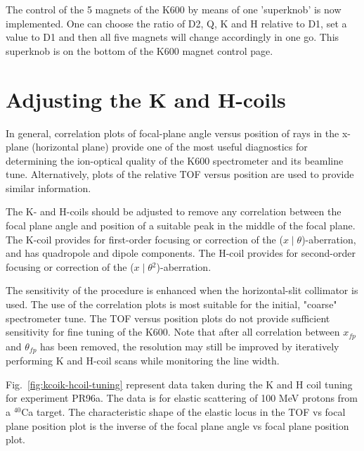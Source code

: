 \documentclass[11pt]{report}
\begin{document}
The control of the 5 magnets of the K600 by means of one 'superknob' is now
implemented. One can choose the ratio of D2, Q, K and H  relative to D1,
set a value to D1 and then all five magnets will change accordingly in
one go.
This superknob is on the bottom of the K600 magnet control page.



\section{Adjusting the K and H-coils}\label{sec:Adjusting-the-K-and-H-coils}

In general, correlation plots of focal-plane angle versus position of rays in
the x-plane (horizontal plane) provide one of the most useful diagnostics for
determining the ion-optical quality of the K600 spectrometer and its beamline
tune.  
Alternatively, plots of the relative TOF versus position are used to provide 
similar information.  

The K- and H-coils should be adjusted to 
remove any correlation between the focal plane angle and position of a
suitable peak in the middle of the focal plane.  The 
K-coil provides for first-order focusing or correction of the 
($x\mid\theta$)-aberration, and has quadropole and dipole components.
The H-coil provides for second-order focusing or correction of the 
($x\mid\theta$$^2$)-aberration.


The sensitivity of the procedure is enhanced when the horizontal-slit 
collimator is used.  The use of the correlation plots is most suitable for 
the initial, "coarse" spectrometer tune. The TOF versus 
position plots do not provide sufficient sensitivity for fine tuning of the 
K600.  
Note that after all correlation between $x_{fp}$ and $\theta_{fp}$ has been removed, 
the resolution may still be improved by iteratively performing K and H-coil scans while monitoring the line width.

Fig.~\ref{fig:kcoik-hcoil-tuning} represent data taken during the 
K and H coil tuning for experiment PR96a. The data is for 
elastic scattering of 100 MeV protons from a $^{40}$Ca target.
The characteristic shape of the elastic locus in the TOF vs focal 
plane position plot is the inverse of the focal plane angle vs focal plane 
position plot.

\end{document}
